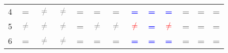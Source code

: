 \begin{table}
\begin{center}
\begin{tabular}{ccccccccccccc}
\multicolumn{1}{c}{4}                                    & \textcolor{gray}{\textbf{=}}                        & \textcolor{gray}{\textbf{$\neq$}}  & \textcolor{gray}{\textbf{$\neq$}} & \textcolor{gray}{\textbf{=}} & \textcolor{gray}{\textbf{=}}             & \textcolor{gray}{\textbf{=}}          &\textcolor{blue}{\textbf{=}}          & \textcolor{blue}{\textbf{=}}          & \textcolor{blue}{\textbf{=}}           & \textcolor{gray}{\textbf{=}}          & \textcolor{gray}{\textbf{=}}         & \textcolor{gray}{\textbf{=}} \\ 
\multicolumn{1}{c}{5}                                    & \textcolor{gray}{\textbf{$\neq$}}               & \textcolor{gray}{\textbf{$\neq$}}  & \textcolor{gray}{\textbf{$\neq$}}  & \textcolor{gray}{\textbf{=}} & \textcolor{gray}{\textbf{$\neq$}}    & \textcolor{gray}{\textbf{$\neq$}} & \textcolor{red}{\textbf{$\neq$}} & \textcolor{blue}{\textbf{=}}           & \textcolor{red}{\textbf{$\neq$}} & \textcolor{gray}{\textbf{=}}          & \textcolor{gray}{\textbf{=}}         & \textcolor{gray}{\textbf{=}} \\ 
\multicolumn{1}{c}{6}                                    & \textcolor{gray}{\textbf{=}}                        & \textcolor{gray}{\textbf{$\neq$}}  & \textcolor{gray}{\textbf{$\neq$}}  & \textcolor{gray}{\textbf{=}} & \textcolor{gray}{\textbf{=}}            & \textcolor{gray}{\textbf{=}}          & \textcolor{blue}{\textbf{=}}           & \textcolor{blue}{\textbf{=}}           & \textcolor{blue}{\textbf{=}}         & \textcolor{gray}{\textbf{=}}          & \textcolor{gray}{\textbf{=}}         & \textcolor{gray}{\textbf{=}} \\ 
\bottomrule
\end{tabular}
\end{center}
\end{table}